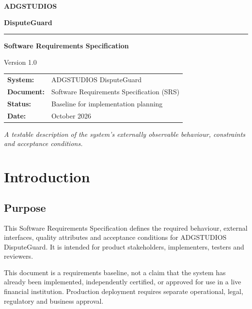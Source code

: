 \documentclass[11pt,a4paper]{article}
\begin{document}
\begin{titlepage}
    \centering
    \vspace*{2cm}
    {\Huge\bfseries ADGSTUDIOS\par}
    \vspace{0.5cm}
    {\LARGE\color{ADGBlue}\bfseries DisputeGuard\par}
    \vspace{1.5cm}
    \rule{0.85\textwidth}{0.8pt}
    \vspace{1cm}
    {\Large\bfseries Software Requirements Specification\par}
    \vspace{0.5cm}
    {\large Version 1.0\par}
    \vfill
    \begin{tabular}{@{}ll@{}}
        \textbf{System:} & ADGSTUDIOS DisputeGuard \\
        \textbf{Document:} & Software Requirements Specification (SRS) \\
        \textbf{Status:} & Baseline for implementation planning \\
        \textbf{Date:} & October 2026 \\
    \end{tabular}
    \vfill
    \textit{A testable description of the system's externally observable
    behaviour, constraints and acceptance conditions.}
\end{titlepage}

\tableofcontents
\newpage

\section{Introduction}

\subsection{Purpose}

This Software Requirements Specification defines the required
behaviour, external interfaces, quality attributes and acceptance
conditions for ADGSTUDIOS DisputeGuard. It is intended for product
stakeholders, implementers, testers and reviewers.

This document is a requirements baseline, not a claim that the system
has already been implemented, independently certified, or approved for
use in a live financial institution. Production deployment requires
separate operational, legal, regulatory and business approval.
\end{document}
